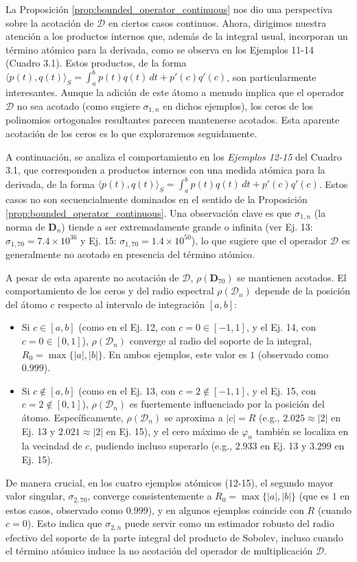 La Proposición \ref{prop:bounded_operator_continuous} nos dio una perspectiva sobre la acotación de $\mathcal{D}$ en ciertos casos continuos. Ahora, dirigimos nuestra atención a los productos internos que, además de la integral usual, incorporan un término atómico para la derivada, como se observa en los Ejemplos 11-14 (Cuadro 3.1). Estos productos, de la forma $\langle p(t),q(t) \rangle_S = \int_{a}^{b} p(t) q(t) \, dt + p'(c)q'(c)$, son particularmente interesantes. Aunque la adición de este átomo a menudo implica que el operador $\mathcal{D}$ no sea acotado (como sugiere $\sigma_{1,n}$ en dichos ejemplos), los ceros de los polinomios ortogonales resultantes parecen mantenerse acotados. Esta aparente acotación de los ceros es lo que exploraremos seguidamente.

A continuación, se analiza el comportamiento en los \textit{Ejemplos 12-15} del Cuadro 3.1, que corresponden a productos internos con una medida atómica para la derivada, de la forma $\langle p(t),q(t) \rangle_S = \int_{a}^{b} p(t) q(t) \, dt + p'(c)q'(c)$. Estos casos no son secuencialmente dominados en el sentido de la Proposición \ref{prop:bounded_operator_continuous}. Una observación clave es que $\sigma_{1,n}$ (la norma de $\mathbf{D}_n$) tiende a ser extremadamente grande o infinita (ver Ej. 13: $\sigma_{1,70} = 7.4 \times 10^{36}$ y Ej. 15: $\sigma_{1,70} = 1.4 \times 10^{50}$), lo que sugiere que el operador $\mathcal{D}$ es generalmente no acotado en presencia del término atómico.

A pesar de esta aparente no acotación de $\mathcal{D}$, $\rho(\mathbf{D}_{70})$ se mantienen acotados. El comportamiento de los ceros y del radio espectral $\rho(\mathcal{D}_n)$ depende de la posición del átomo $c$ respecto al intervalo de integración $[a,b]$:
\begin{itemize}
	\item Si $c \in [a,b]$ (como en el Ej. 12, con $c=0 \in [-1,1]$, y el Ej. 14, con $c=0 \in [0,1]$), $\rho(\mathcal{D}_n)$ converge al radio del soporte de la integral, $R_0 = \max\{|a|,|b|\}$. En ambos ejemplos, este valor es $1$ (observado como $0.999$).
	\item Si $c \notin [a,b]$ (como en el Ej. 13, con $c=2 \notin [-1,1]$, y el Ej. 15, con $c=2 \notin [0,1]$), $\rho(\mathcal{D}_n)$ es fuertemente influenciado por la posición del átomo. Específicamente, $\rho(\mathcal{D}_n)$ se aproxima a $|c|=R$ (e.g., $2.025 \approx |2|$ en Ej. 13 y $2.021 \approx |2|$ en Ej. 15), y el cero máximo de $\varphi_n$ también se localiza en la vecindad de $c$, pudiendo incluso superarlo (e.g., $2.933$ en Ej. 13 y $3.299$ en Ej. 15).
\end{itemize}
De manera crucial, en los cuatro ejemplos atómicos (12-15), el segundo mayor valor singular, $\sigma_{2,70}$, converge consistentemente a $R_0 = \max\{|a|,|b|\}$ (que es $1$ en estos casos, observado como $0.999$), y en algunos ejemplos coincide con $R$ (cuando $c=0$). Esto indica que $\sigma_{2,n}$ puede servir como un estimador robusto del radio efectivo del soporte de la parte integral del producto de Sobolev, incluso cuando el término atómico induce la no acotación del operador de multiplicación $\mathcal{D}$.


